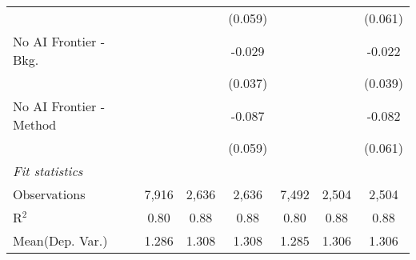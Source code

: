 \begin{tabular}{lcccccc}
                           &              &         & (0.059)      &              &         & (0.061)\\   
   No AI Frontier - Bkg.   &              &         & -0.029       &              &         & -0.022\\   
                           &              &         & (0.037)      &              &         & (0.039)\\   
   No AI Frontier - Method &              &         & -0.087       &              &         & -0.082\\   
                           &              &         & (0.059)      &              &         & (0.061)\\   
   \midrule
   \emph{Fit statistics}\\
   Observations            & 7,916        & 2,636   & 2,636        & 7,492        & 2,504   & 2,504\\  
   R$^2$                   & 0.80         & 0.88    & 0.88         & 0.80         & 0.88    & 0.88\\  
Mean(Dep. Var.) & 1.286 & 1.308 & 1.308 & 1.285 & 1.306 & 1.306 \\
   

\end{tabular}
